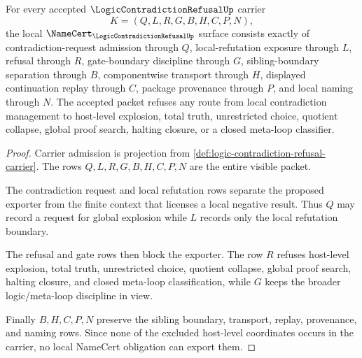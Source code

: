 \begin{theorem}
\label{thm:logic-contradiction-refusal-namecert-obligations}
For every accepted $\LogicContradictionRefusalUp$ carrier
$$
K=(Q,L,R,G,B,H,C,P,N),
$$
the local $\NameCert_{\LogicContradictionRefusalUp}$ surface consists exactly of contradiction-request admission through $Q$, local-refutation exposure through $L$, refusal through $R$, gate-boundary discipline through $G$, sibling-boundary separation through $B$, componentwise transport through $H$, displayed continuation replay through $C$, package provenance through $P$, and local naming through $N$. The accepted packet refuses any route from local contradiction management to host-level explosion, total truth, unrestricted choice, quotient collapse, global proof search, halting closure, or a closed meta-loop classifier.
\end{theorem}
\begin{proof}
Carrier admission is projection from \autoref{def:logic-contradiction-refusal-carrier}. The rows $Q,L,R,G,B,H,C,P,N$ are the entire visible packet.

The contradiction request and local refutation rows separate the proposed exporter from the finite context that licenses a local negative result. Thus $Q$ may record a request for global explosion while $L$ records only the local refutation boundary.

The refusal and gate rows then block the exporter. The row $R$ refuses host-level explosion, total truth, unrestricted choice, quotient collapse, global proof search, halting closure, and closed meta-loop classification, while $G$ keeps the broader logic/meta-loop discipline in view.

Finally $B,H,C,P,N$ preserve the sibling boundary, transport, replay, provenance, and naming rows. Since none of the excluded host-level coordinates occurs in the carrier, no local NameCert obligation can export them.
\end{proof}

